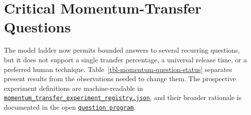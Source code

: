 \documentclass[
  letterpaper,
]{report}
\begin{document}
\chapter{Critical Momentum-Transfer
Questions}\label{sec-critical-momentum-questions}

The model ladder now permits bounded answers to several recurring
questions, but it does not support a single transfer percentage, a
universal release time, or a preferred human technique.
Table~\ref{tbl-momentum-question-status} separates present results from
the observations needed to change them. The prospective experiment
definitions are machine-readable in
\href{../data/momentum_transfer_experiment_registry.json}{\texttt{momentum\_transfer\_experiment\_registry.json}},
and their broader rationale is documented in the open
\href{../MOMENTUM_TRANSFER_QUESTION_PROGRAM.md}{\texttt{question\ program}}.
\end{document}
